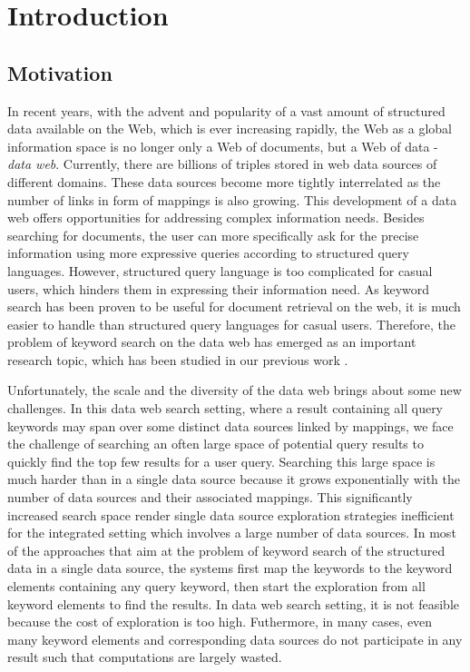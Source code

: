 \chapter{Introduction}\label{intro}

\section{Motivation}\label{intro:motivation}
In recent years, with the advent and popularity of a vast amount of structured data available on the
Web, which is ever increasing rapidly, the Web as a global information space is no longer only a Web
of documents, but a Web of data - {\em data web}. Currently, there are billions of triples stored in
web data sources of different domains. These data sources become more tightly interrelated as the
number of links in form of mappings is also growing. This development of a data web offers
opportunities for addressing complex information needs. Besides searching for documents, the user can
more specifically ask for the precise information using more expressive queries according to
structured query languages. However, structured query language is too complicated for casual users,
which hinders them in expressing their information need. As keyword search has been proven to be
useful for document retrieval on the web, it is much easier to handle than structured query languages
for casual users. Therefore, the problem of keyword search on the data web has emerged as an
important research topic, which has been studied in our previous work \citep{TranTR}.

Unfortunately, the scale and the diversity of the data web brings about some new challenges. In this
data web search setting, where a result containing all query keywords may span over some distinct
data sources linked by mappings, we face the challenge of searching an often large space of potential
query results to quickly find the top few results for a user query. Searching this large space is
much harder than in a single data source because it grows exponentially with the number of data
sources and their associated mappings. This significantly increased search space render single data
source exploration strategies inefficient for the integrated setting which involves a large number of
data sources. In most of the approaches that aim at the problem of keyword search of the structured
data in a single data source, the systems first map the keywords to the keyword elements containing
any query keyword, then start the exploration from all keyword elements to find the results. In data
web search setting, it is not feasible because the cost of exploration is too high. Futhermore, in
many cases, even many keyword elements and corresponding data sources do not participate in any
result such that computations are largely wasted.

